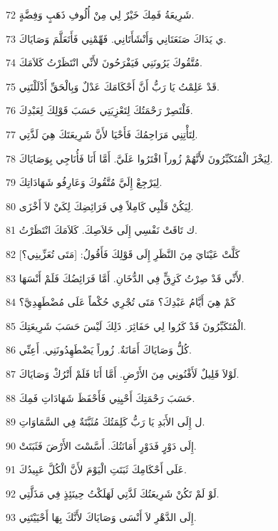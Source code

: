 \par 72 شَرِيعَةُ فَمِكَ خَيْرٌ لِي مِنْ أُلُوفِ ذَهَبٍ وَفِضَّةٍ.
\par 73 ي يَدَاكَ صَنَعَتَانِي وَأَنْشَأَتَانِي. فَهِّمْنِي فَأَتَعَلَّمَ وَصَايَاكَ.
\par 74 مُتَّقُوكَ يَرُونَنِي فَيَفْرَحُونَ لأَنِّي انْتَظَرْتُ كَلاَمَكَ.
\par 75 قَدْ عَلِمْتُ يَا رَبُّ أَنَّ أَحْكَامَكَ عَدْلٌ وَبِالْحَقِّ أَذْلَلْتَنِي.
\par 76 فَلْتَصِرْ رَحْمَتُكَ لِتَعْزِيَتِي حَسَبَ قَوْلِكَ لِعَبْدِكَ.
\par 77 لِتَأْتِنِي مَرَاحِمُكَ فَأَحْيَا لأَنَّ شَرِيعَتَكَ هِيَ لَذَّتِي.
\par 78 لِيَخْزَ الْمُتَكَبِّرُونَ لأَنَّهُمْ زُوراً افْتَرُوا عَلَيَّ. أَمَّا أَنَا فَأُنَاجِي بِوَصَايَاكَ.
\par 79 لِيَرْجِعْ إِلَيَّ مُتَّقُوكَ وَعَارِفُو شَهَادَاتِكَ.
\par 80 لِيَكُنْ قَلْبِي كَامِلاً فِي فَرَائِضِكَ لِكَيْ لاَ أَخْزَى.
\par 81 ك تَاقَتْ نَفْسِي إِلَى خَلاَصِكَ. كَلاَمَكَ انْتَظَرْتُ.
\par 82 كَلَّتْ عَيْنَايَ مِنَ النَّظَرِ إِلَى قَوْلِكَ فَأَقُولُ: [مَتَى تُعَزِّينِي؟]
\par 83 لأَنِّي قَدْ صِرْتُ كَزِقٍّ فِي الدُّخَانِ. أَمَّا فَرَائِضُكَ فَلَمْ أَنْسَهَا.
\par 84 كَمْ هِيَ أَيَّامُ عَبْدِكَ؟ مَتَى تُجْرِي حُكْماً عَلَى مُضْطَهِدِيَّ؟
\par 85 الْمُتَكَبِّرُونَ قَدْ كَرُوا لِي حَفَائِرَ. ذَلِكَ لَيْسَ حَسَبَ شَرِيعَتِكَ.
\par 86 كُلُّ وَصَايَاكَ أَمَانَةٌ. زُوراً يَضْطَهِدُونَنِي. أَعِنِّي.
\par 87 لَوْلاَ قَلِيلٌ لَأَفْنُونِي مِنَ الأَرْضِ. أَمَّا أَنَا فَلَمْ أَتْرُكْ وَصَايَاكَ.
\par 88 حَسَبَ رَحْمَتِكَ أَحْيِنِي فَأَحْفَظَ شَهَادَاتِ فَمِكَ.
\par 89 ل إِلَى الأَبَدِ يَا رَبُّ كَلِمَتُكَ مُثَبَّتَةٌ فِي السَّمَاوَاتِ.
\par 90 إِلَى دَوْرٍ فَدَوْرٍ أَمَانَتُكَ. أَسَّسْتَ الأَرْضَ فَثَبَتَتْ.
\par 91 عَلَى أَحْكَامِكَ ثَبَتَتِ الْيَوْمَ لأَنَّ الْكُلَّ عَبِيدُكَ.
\par 92 لَوْ لَمْ تَكُنْ شَرِيعَتُكَ لَذَّتِي لَهَلَكْتُ حِينَئِذٍ فِي مَذَلَّتِي.
\par 93 إِلَى الدَّهْرِ لاَ أَنْسَى وَصَايَاكَ لأَنَّكَ بِهَا أَحْيَيْتَنِي.
